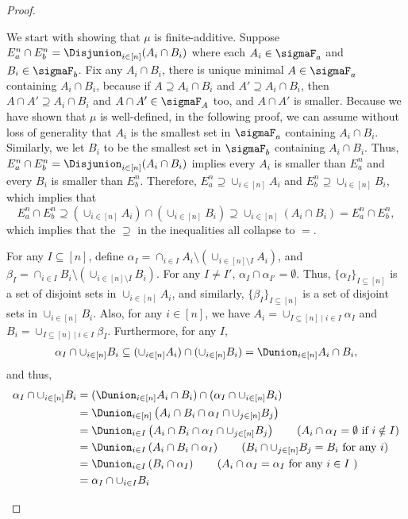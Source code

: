 \documentclass[acmsmall,nonacm,screen,appendix]{acmart}
\begin{document}
\begin{proof}
\begin{itemize}
   We start with showing that $\mu$ is finite-additive.
   Suppose $E_a^n \cap E_b^n = \Disjunion_{i \in [n]}(A_i \cap B_i)$ where
   each $A_i \in \sigmaF_a$ and $B_i \in \sigmaF_b$.
  Fix any $A_i \cap B_i$, there is unique minimal $A \in \sigmaF_a$ containing
  $A_i \cap B_i$, because if $A \supseteq A_i \cap B_i$ and  $A' \supseteq
  A_i \cap B_i$, then  $A \cap A' \supseteq A_i \cap B_i$
  and $A \cap A' \in \sigmaF_A$ too, and $A \cap A'$ is smaller.
   Because we have shown that $\mu$ is well-defined, in the following proof,
   we can assume without loss of generality that $A_i$ is the smallest set in $\sigmaF_a$ containing $A_i \cap B_i$.
   Similarly, we let $B_i$ to be the smallest set in $\sigmaF_b$ containing $A_i \cap B_i$.
   Thus,  $E_a^n \cap E_b^n = \Disjunion_{i \in [n]}(A_i \cap B_i)$ implies
   every $A_i$ is smaller than $E_a^n$ and every $B_i$ is smaller than $E_b^n$.
   Therefore,
   $E_a^n \supseteq \cup_{i \in [n]} A_i$ and
   $E_b^n \supseteq \cup_{i \in [n]} B_i$,
   which implies that
   \[
    E_a^n \cap E_b^n \supseteq (\cup_{i \in [n]} A_i) \cap (\cup_{i \in [n]} B_i) \supseteq \cup_{i \in [n] } (A_i \cap B_i) = E_a^n \cap E_b^n,
   \]
   which implies that the $\supseteq$ in the inequalities all collapse to $=$.




   For any $I \subseteq [n]$, define
   $\alpha_I = \cap_{i \in I} A_i \setminus (\cup_{i \in [n] \setminus I} A_i)$, and $\beta_I = \cap_{i \in I} B_i \setminus (\cup_{i \in [n] \setminus I} B_i)$.
   For any $I \neq I'$, $\alpha_I \cap \alpha_{I'} = \emptyset$.
   Thus, $\{\alpha_I\}_{I \subseteq [n]}$ is a set of disjoint sets in $\cup_{i \in [n]} A_i$,
   and similarly, $\{\beta_I\}_{I \subseteq [n]}$ is a set of disjoint sets in $\cup_{i \in [n]} B_i$.
   Also, for any $i \in [n]$,
   we have
   $A_i = \cup_{I \subseteq [n] \mid i \in I} \alpha_I $
   and
   $B_i = \cup_{I \subseteq [n] \mid i \in I} \beta_I $.
   Furthermore, for any $I$,
\begin{align*}
    \alpha_I \cap \cup_{i \in [n]} B_i
    \subseteq (\cup_{i \in [n]} A_i) \cap (\cup_{i \in [n]} B_i)
    = \Dunion_{i \in [n]} A_i \cap B_i ,
   \end{align*}
and thus,
\begin{align}
    \alpha_I \cap \cup_{i \in [n]} B_i
    & = (\Dunion_{i \in [n]} A_i \cap B_i) \cap (\alpha_I \cap \cup_{i \in [n]} B_i) \notag \\
    & = \Dunion_{i \in [n]} \left( A_i \cap B_i \cap \alpha_I \cap \cup_{j \in [n]} B_j \right) \notag \\
    & = \Dunion_{i \in I} \left( A_i \cap B_i \cap \alpha_I \cap \cup_{j \in [n]} B_j \right)  \tag{$A_i \cap \alpha_I = \emptyset$ if $i \notin I$} \\
    & = \Dunion_{i \in I} \left( A_i \cap B_i \cap \alpha_I\right)
    \tag{$B_i \cap \cup_{j \in [n]} B_j = B_i$ for any $i$}\\
    & = \Dunion_{i \in I} \left( B_i \cap \alpha_I\right)
    \tag{$A_i \cap \alpha_I = \alpha_I$ for any $i \in I$ }\\
    & = \alpha_I \cap \cup_{i \in I } B_i
    \label{eq:finite-add-alpha}
   \end{align}


\end{itemize}
\end{proof}
\end{document}
